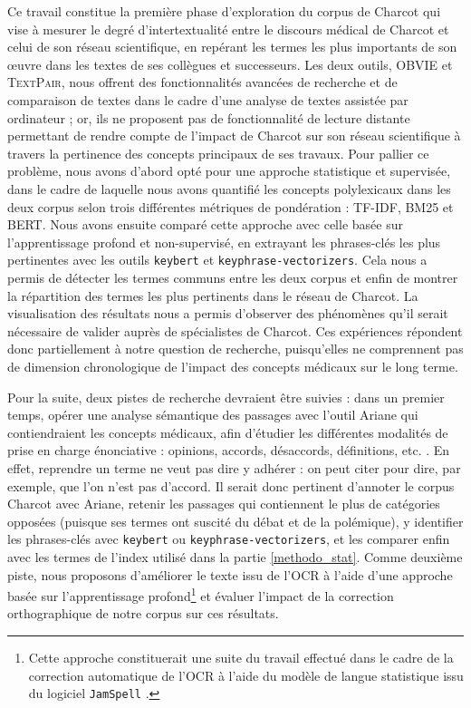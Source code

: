 



Ce travail constitue la première phase d'exploration du corpus de Charcot qui vise à mesurer le degré d'intertextualité entre le discours médical de Charcot et celui de son réseau scientifique, en repérant les termes les plus importants de son \oe{}uvre dans les textes de ses collègues et successeurs. Les deux outils, \textsc{OBVIE} et \textsc{TextPair}, nous offrent des fonctionnalités avancées de recherche et de comparaison de textes dans le cadre d'une analyse de textes assistée par ordinateur ; or, ils ne proposent pas de fonctionnalité de lecture distante permettant de rendre compte de l'impact de Charcot sur son réseau scientifique à travers la pertinence des concepts principaux de ses travaux. Pour pallier ce problème, nous avons d'abord opté pour une approche statistique et supervisée, dans le cadre de laquelle nous avons quantifié les concepts polylexicaux dans les deux corpus selon trois différentes métriques de pondération : \textsc{TF-IDF}, \textsc{BM25} et \textsc{BERT}. Nous avons ensuite comparé cette approche avec celle basée sur l'apprentissage profond et non-supervisé, en extrayant les phrases-clés les plus pertinentes avec les outils \texttt{keybert} et \texttt{keyphrase-vectorizers}. Cela nous a permis de détecter les termes communs entre les deux corpus et enfin de montrer la répartition des termes les plus pertinents dans le réseau de Charcot. La visualisation des résultats nous a permis d'observer des phénomènes qu'il serait nécessaire de valider auprès de spécialistes de Charcot. Ces expériences répondent donc partiellement à notre question de recherche, puisqu'elles ne comprennent pas de dimension chronologique de l'impact des concepts médicaux sur le long terme.

Pour la suite, deux pistes de recherche devraient être suivies : dans un premier temps, opérer une analyse sémantique des passages avec l'outil Ariane qui contiendraient les concepts médicaux, afin d'étudier les différentes modalités de prise en charge énonciative : opinions, accords, désaccords, définitions, etc. \citep{alrahabi2021ariane}. En effet, reprendre un terme ne veut pas dire y adhérer : on peut citer pour dire, par exemple, que l'on n'est pas d'accord. 
Il serait donc pertinent d'annoter le corpus Charcot avec Ariane, retenir les passages qui contiennent le plus de catégories \og{}opposées\fg{} (puisque ses termes ont suscité du débat et de la polémique), y identifier les phrases-clés avec \texttt{keybert} ou \texttt{keyphrase-vectorizers}, et les comparer enfin avec les termes de l'index utilisé dans la partie \ref{methodo_stat}. Comme deuxième piste, nous proposons d'améliorer le texte issu de l'\textsc{OCR} à l'aide d'une approche basée sur l'apprentissage profond\footnote{Cette approche constituerait une suite du travail effectué dans le cadre de la correction automatique de l'\textsc{OCR} à l'aide du modèle de langue statistique issu du logiciel \texttt{JamSpell} \citep{petkovic2022impact}.} et évaluer l'impact de la correction orthographique de notre corpus sur ces résultats.



